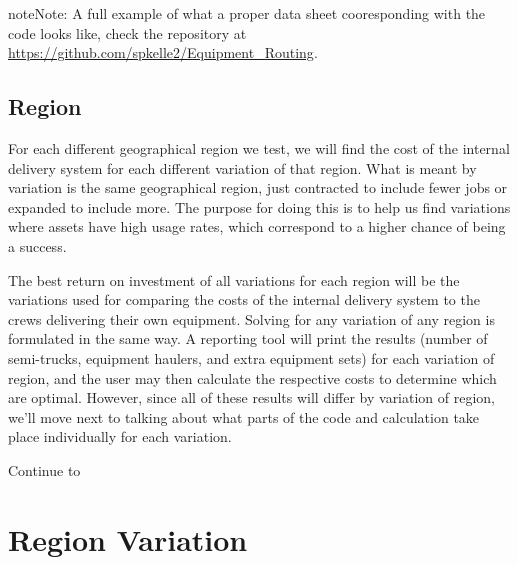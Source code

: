\documentclass[letterpaper,10pt,english]{sphinxmanual}
\begin{document}
\noindent{}

\noindent{}

\begin{sphinxadmonition}{note}{Note:}
A full example of what a proper data sheet cooresponding with the code
looks like, check the repository at
\url{https://github.com/spkelle2/Equipment\_Routing}.
\end{sphinxadmonition}


\section{Region}
\label{\detokenize{main:region}}
For each different geographical region we test, we will find the cost of the
internal delivery system for each different variation of that region. What is
meant by variation is the same geographical region, just contracted to include
fewer jobs or expanded to include more. The purpose for doing this is to help
us find variations where assets have high usage rates, which correspond to a
higher chance of being a success.

The best return on investment of all variations for each region will be the
variations used for comparing the costs of the internal delivery system to
the crews delivering their own equipment. Solving for any variation of any
region is formulated in the same way. A reporting tool will print the results
(number of semi-trucks, equipment haulers, and extra equipment sets) for
each variation of region, and the user may then calculate the respective
costs to determine which are optimal. However, since all of these results
will differ by variation of region, we'll move next to talking about what
parts of the code and calculation take place individually for each variation.

Continue to {\hyperref[\detokenize{variation:variation}]{}}


\chapter{Region Variation}
\label{\detokenize{variation:region-variation}}\label{\detokenize{variation::doc}}\label{\detokenize{variation:variation}}
\end{document}

